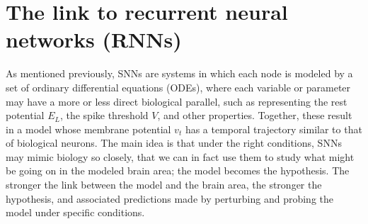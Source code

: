 \documentclass[mphil,deptreport,ianc]{infthesis} %
\begin{document}



\section{The link to recurrent neural networks (RNNs)}

As mentioned previously, SNNs are systems in which each node is modeled by a set of ordinary differential equations (ODEs), where each variable or parameter may have a more or less direct biological parallel, such as representing the rest potential $E_L$, the spike threshold $V$, and other properties.
Together, these result in a model whose membrane potential $v_t$ has a temporal trajectory similar to that of biological neurons.
The main idea is that under the right conditions, SNNs may mimic biology so closely, that we can in fact use them to study what might be going on in the modeled brain area; the model becomes the hypothesis.
The stronger the link between the model and the brain area, the stronger the hypothesis, and associated predictions made by perturbing and probing the model under specific conditions.
\end{document}
